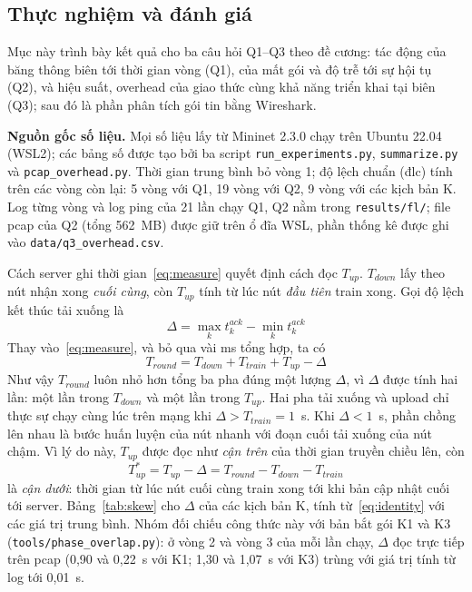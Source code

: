 \subsection{Thực nghiệm và đánh giá}
\label{sec:2-7}
Mục này trình bày kết quả cho ba câu hỏi Q1--Q3 theo đề cương: tác động của băng thông biên tới thời gian vòng (Q1), của mất gói và độ trễ tới sự hội tụ (Q2), và hiệu suất, overhead của giao thức cùng khả năng triển khai tại biên (Q3); sau đó là phần phân tích gói tin bằng Wireshark.

\textbf{Nguồn gốc số liệu.} Mọi số liệu lấy từ Mininet 2.3.0 chạy trên Ubuntu 22.04 (WSL2); các bảng số được tạo bởi ba script \texttt{run\_experiments.py}, \texttt{summarize.py} và \texttt{pcap\_overhead.py}. Thời gian trung bình bỏ vòng 1; độ lệch chuẩn (đlc) tính trên các vòng còn lại: 5 vòng với Q1, 19 vòng với Q2, 9 vòng với các kịch bản K. Log từng vòng và log ping của 21 lần chạy Q1, Q2 nằm trong \texttt{results/fl/}; file pcap của Q2 (tổng 562~MB) được giữ trên ổ đĩa WSL, phần thống kê được ghi vào \texttt{data/q3\_overhead.csv}.

Cách server ghi thời gian~\eqref{eq:measure} quyết định cách đọc $T_{up}$. $T_{down}$ lấy theo nút nhận xong \emph{cuối cùng}, còn $T_{up}$ tính từ lúc nút \emph{đầu tiên} train xong. Gọi độ lệch kết thúc tải xuống là
\begin{equation}
    \Delta = \max_k t^{ack}_k - \min_k t^{ack}_k
    \label{eq:skew}
\end{equation}
Thay vào~\eqref{eq:measure}, và bỏ qua vài ms tổng hợp, ta có
\begin{equation}
    T_{round} = T_{down} + T_{train} + T_{up} - \Delta
    \label{eq:identity}
\end{equation}
Như vậy $T_{round}$ luôn nhỏ hơn tổng ba pha đúng một lượng $\Delta$, vì $\Delta$ được tính hai lần: một lần trong $T_{down}$ và một lần trong $T_{up}$. Hai pha tải xuống và upload chỉ thực sự chạy cùng lúc trên mạng khi $\Delta > T_{train} = 1$~s. Khi $\Delta < 1$~s, phần chồng lên nhau là bước huấn luyện của nút nhanh với đoạn cuối tải xuống của nút chậm. Vì lý do này, $T_{up}$ được đọc như \emph{cận trên} của thời gian truyền chiều lên, còn
\begin{equation}
    T_{up}^{*} = T_{up} - \Delta = T_{round} - T_{down} - T_{train}
    \label{eq:tupnet}
\end{equation}
là \emph{cận dưới}: thời gian từ lúc nút cuối cùng train xong tới khi bản cập nhật cuối tới server. Bảng~\ref{tab:skew} cho $\Delta$ của các kịch bản K, tính từ~\eqref{eq:identity} với các giá trị trung bình. Nhóm đối chiếu công thức này với bản bắt gói K1 và K3 (\nolinkurl{tools/phase_overlap.py}): ở vòng 2 và vòng 3 của mỗi lần chạy, $\Delta$ đọc trực tiếp trên pcap (0{,}90 và 0{,}22~s với K1; 1{,}30 và 1{,}07~s với K3) trùng với giá trị tính từ log tới 0{,}01~s.

